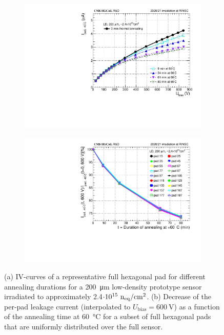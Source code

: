 \begin{figure}
	\captionsetup[subfigure]{aboveskip=-1pt,belowskip=-1pt}
	\centering
	\begin{subfigure}[b]{0.49\textwidth}
		\includegraphics[width=0.999\textwidth]{plots/annealing_iv/annealing_IV_ch24.pdf}
		\subcaption{
		}
		\label{plot:annealing_IV}
	\end{subfigure}
	\hfill
	\begin{subfigure}[b]{0.49\textwidth}
		\includegraphics[width=0.999\textwidth]{plots/annealing_iv/annealing_current.pdf}
		\subcaption{
		}
		\label{plot:annealing_current}
	\end{subfigure}    

	\caption{
		(a) IV-curves of a representative full hexagonal pad for different annealing durations for a \SI{200}{\micro\metre} low-density prototype sensor irradiated to approximately 2.4$\cdot 10^{15}~\mathrm{n_{eq}}/\mathrm{cm}^{2}$.
        (b) Decrease of the per-pad leakage current (interpolated to $U_\text{bias}=\SI{600}{\volt}$) as a function of the annealing time at \SI{60}{\celsius} for a subset of full hexagonal pads that are uniformly distributed over the full sensor.
	}
\end{figure}
